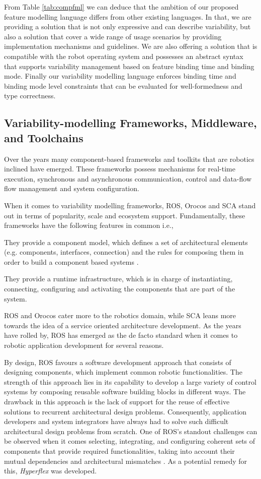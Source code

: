 \documentclass[conference]{IEEEtran}
\begin{document}
From Table \ref{tab:compfml} we can deduce that the ambition of our proposed feature modelling language differs from other existing languages. In that, we are providing a solution that is not only expressive and can describe variability, but also a solution that cover a wide range of usage scenarios by providing implementation mechanisms and guidelines. We are also offering a solution that is compatible with the robot operating system and possesses an abstract syntax that supports variability management based on feature binding time and binding mode. Finally our variability modelling language enforces binding time and binding mode level constraints that can be evaluated for well-formedness and type correctness.

\subsection{Variability-modelling Frameworks, Middleware, and Toolchains}
Over the years many component-based frameworks and toolkits that are robotics inclined
have emerged. These frameworks possess mechanisms for real-time execution, synchronous and asynchronous communication, control and data-flow flow management and system configuration.

When it comes to variability modelling frameworks, ROS, Orocos and SCA stand out in terms of popularity, scale and ecosystem support. Fundamentally, these frameworks have the following features in common i.e., \begin{enumerate*}[label=(\roman*)]
	\item They provide a component model, which defines a set of architectural
elements (e.g. components, interfaces, connection) and the rules for
composing them in order to build a component based systems \cite{lgherardi}.
	\item They provide a runtime infrastructure, which is in charge of instantiating, connecting, configuring and activating the components that are part of the system.
\end{enumerate*} 
ROS and Orocos cater more to the robotics domain, while SCA leans more towards the idea of a service oriented architecture development. As the years have rolled by, ROS has emerged as the de facto standard when it comes to robotic application development for several reasons.

By design, ROS favours a software development approach that consists of designing components, which implement common robotic functionalities. The strength of this approach lies in its capability to develop a large variety of control systems by composing reusable software building blocks in different ways. The drawback in this approach is the lack of support for the
reuse of effective solutions to recurrent architectural design problems. Consequently, application developers and system integrators have always had to solve such difficult architectural design problems from scratch. One of ROS's standout challenges can be observed when it comes selecting, integrating, and configuring coherent sets of components that provide required functionalities, taking into account their mutual dependencies and architectural mismatches \cite{ros-ref}. As a potential remedy for this, \textit{Hyperflex} was developed.
\end{document}
